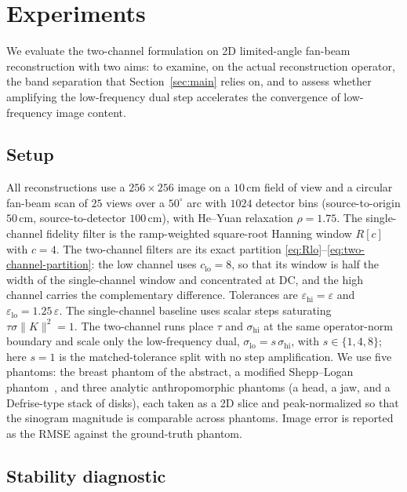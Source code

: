 \documentclass{article}
\begin{document}
\section{Experiments}
\label{sec:experiments}

We evaluate the two-channel formulation on 2D limited-angle fan-beam reconstruction with two aims: to examine, on the actual reconstruction operator, the band separation that Section~\ref{sec:main} relies on, and to assess whether amplifying the low-frequency dual step accelerates the convergence of low-frequency image content.

\subsection{Setup}

All reconstructions use a $256\times256$ image on a $10\,\mathrm{cm}$ field of view and a circular fan-beam scan of $25$ views over a $50^\circ$ arc with $1024$ detector bins (source-to-origin $50\,\mathrm{cm}$, source-to-detector $100\,\mathrm{cm}$), with He--Yuan relaxation $\rho=1.75$. The single-channel fidelity filter is the ramp-weighted square-root Hanning window $R[c]$ with $c=4$. The two-channel filters are its exact partition \eqref{eq:Rlo}--\eqref{eq:two-channel-partition}: the low channel uses $c_{\mathrm{lo}}=8$, so that its window is half the width of the single-channel window and concentrated at DC, and the high channel carries the complementary difference. Tolerances are $\varepsilon_{\mathrm{hi}}=\varepsilon$ and $\varepsilon_{\mathrm{lo}}=1.25\,\varepsilon$. The single-channel baseline uses scalar steps saturating $\tau\sigma\|K\|^2=1$. The two-channel runs place $\tau$ and $\sigma_{\mathrm{hi}}$ at the same operator-norm boundary and scale only the low-frequency dual, $\sigma_{\mathrm{lo}}=s\,\sigma_{\mathrm{hi}}$, with $s\in\{1,4,8\}$; here $s=1$ is the matched-tolerance split with no step amplification. We use five phantoms: the breast phantom of the abstract, a modified Shepp--Logan phantom~\citep{shepp1974fourier}, and three analytic anthropomorphic phantoms (a head, a jaw, and a Defrise-type stack of disks), each taken as a 2D slice and peak-normalized so that the sinogram magnitude is comparable across phantoms. Image error is reported as the RMSE against the ground-truth phantom.

\subsection{Stability diagnostic}
\end{document}
